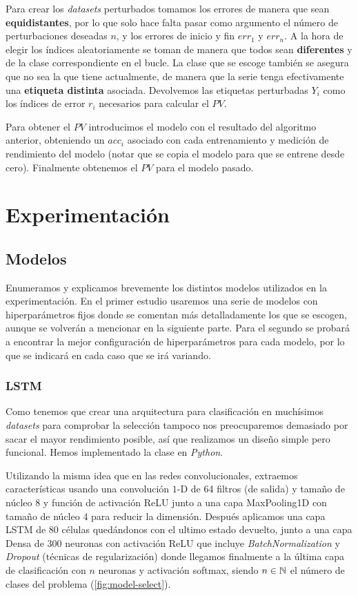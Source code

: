 Para crear los \emph{datasets} perturbados tomamos los errores de manera que sean \textbf{equidistantes}, por lo que solo hace falta pasar como argumento el número de perturbaciones deseadas $n$, y los errores de inicio y fin $err_{1}$ y $err_{n}$. A la hora de elegir los índices aleatoriamente se toman de manera que todos sean \textbf{diferentes} y de la clase correspondiente en el bucle. La clase que se escoge también se asegura que no sea la que tiene actualmente, de manera que la serie tenga efectivamente una \textbf{etiqueta distinta} asociada. Devolvemos las etiquetas perturbadas $Y_i$ como los índices de error $r_i$ necesarios para calcular el $PV$.

Para obtener el $PV$ introducimos el modelo con el resultado del algoritmo anterior, obteniendo un $acc_i$ asociado con cada entrenamiento y medición de rendimiento del modelo (notar que se copia el modelo para que se entrene desde cero). Finalmente obtenemos el $PV$ para el modelo pasado.

\chapter{Experimentación}\label{ch:pv-experimentacion}

\section{Modelos}

Enumeramos y explicamos brevemente los distintos modelos utilizados en la experimentación. En el primer estudio usaremos una serie de modelos con hiperparámetros fijos donde se comentan más detalladamente los que se escogen, aunque se volverán a mencionar en la siguiente parte. Para el segundo se probará a encontrar la mejor configuración de hiperparámetros para cada modelo, por lo que se indicará en cada caso que se irá variando.

\subsection{LSTM}

Como tenemos que crear una arquitectura para clasificación en muchísimos \emph{datasets} para comprobar la selección tampoco nos preocuparemos demasiado por sacar el mayor rendimiento posible, así que realizamos un diseño simple pero funcional. Hemos implementado la clase en \emph{Python}.

Utilizando la misma idea que en las redes convolucionales, extraemos características usando una convolución $1$-D de 64 filtros (de salida) y tamaño de núcleo 8 y función de activación ReLU junto a una capa MaxPooling1D con tamaño de núcleo 4 para reducir la dimensión. Después aplicamos una capa LSTM de 80 células quedándonos con el ultimo estado devuelto, junto a una capa Densa de 300 neuronas con activación ReLU que incluye \emph{BatchNormalization} y \emph{Dropout} (técnicas de regularización) donde llegamos finalmente a la última capa de clasificación con $n$ neuronas y activación softmax, siendo $n \in \mathbb{N}$ el número de clases del problema (\autoref{fig:model-select}).

